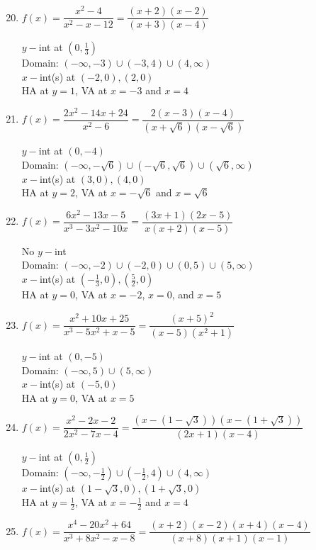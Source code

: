 \documentclass[12pt]{book}
\theoremstyle{definition}
\begin{document}
			\begin{enumerate}
			\setcounter{enumi}{19}
				\item $f(x)=\dfrac{x^2-4}{x^2-x-12}=\dfrac{(x+2)(x-2)}{(x+3)(x-4)}$
				\par
				$y-$int at $(0,\frac{1}{3})$\\
				Domain: $(-\infty,-3)\cup(-3,4)\cup(4,\infty)$\\
				$x-$int(s) at $(-2,0), (2,0)$\\
				HA at $y=1$, VA at $x=-3$ and $x=4$
				\item $f(x)=\dfrac{2x^2-14x+24}{x^2-6}=\dfrac{2(x-3)(x-4)}{(x+\sqrt{6})(x-\sqrt{6})}$
				\par
				$y-$int at $(0,-4)$\\
				Domain: $(-\infty,-\sqrt{6})\cup(-\sqrt{6},\sqrt{6})\cup(\sqrt{6},\infty)$\\
				$x-$int(s) at $(3,0), (4,0)$\\
				HA at $y=2$, VA at $x=-\sqrt{6}$ and $x=\sqrt{6}$
				\item $f(x)=\dfrac{6x^2-13x-5}{x^3-3x^2-10x}=\dfrac{(3x+1)(2x-5)}{x(x+2)(x-5)}$
				\par
				No $y-$int\\
				Domain: $(-\infty,-2)\cup(-2,0)\cup(0,5)\cup(5,\infty)$\\
				$x-$int(s) at $(-\frac{1}{3},0), (\frac{5}{2},0)$\\
				HA at $y=0$, VA at $x=-2$, $x=0$, and $x=5$
				\item $f(x)=\dfrac{x^2+10x+25}{x^3-5x^2+x-5}=\dfrac{(x+5)^2}{(x-5)(x^2+1)}$
				\par
				$y-$int at $(0,-5)$\\
				Domain: $(-\infty,5)\cup(5,\infty)$\\
				$x-$int(s) at $(-5,0)$\\
				HA at $y=0$, VA at $x=5$
				\item $f(x)=\dfrac{x^2-2x-2}{2x^2-7x-4}=\dfrac{(x-(1-\sqrt{3}))(x-(1+\sqrt{3}))}{(2x+1)(x-4)}$
				\par
				$y-$int at $(0,\frac{1}{2})$\\
				Domain: $(-\infty,-\frac{1}{2})\cup(-\frac{1}{2},4)\cup(4,\infty)$\\
				$x-$int(s) at $(1-\sqrt{3},0), (1+\sqrt{3},0)$\\
				HA at $y=\frac{1}{2}$, VA at $x=-\frac{1}{2}$ and $x=4$
				\item $f(x)=\dfrac{x^4-20x^2+64}{x^3+8x^2-x-8}=\dfrac{(x+2)(x-2)(x+4)(x-4)}{(x+8)(x+1)(x-1)}$
				\par

\end{enumerate}
\end{document}
